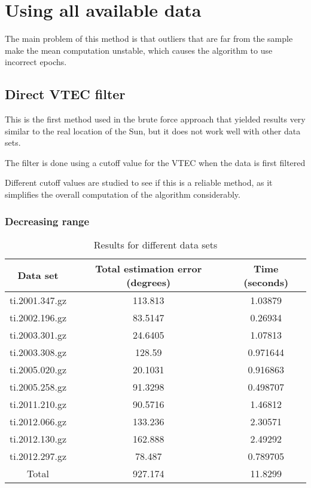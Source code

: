 \section{Using all available data}

The main problem of this method is that outliers that are far from the sample make the mean computation unstable, which causes the algorithm to use incorrect epochs.



\subsection{Direct VTEC filter}

This is the first method used in the brute force approach that yielded results very similar to the real location of the Sun, but it does not work well with other data sets.

The filter is done using a cutoff value for the VTEC when the data is first filtered

Different cutoff values are studied to see if this is a reliable method, as it simplifies the overall computation of the algorithm considerably.

\subsubsection{Decreasing range}

\begin{table}[h!]
	\centering
	\def\arraystretch{1.2}
	\begin{tabular}{|c c c|} 
		\hline
		Data set & Total estimation error (degrees) & Time (seconds) \\ [0.5ex] 
		\hline\hline
		ti.2001.347.gz & 113.813 & 1.03879 \\
		\hline
		ti.2002.196.gz & 83.5147 & 0.26934 \\
		\hline
		ti.2003.301.gz & 24.6405 & 1.07813 \\
		\hline
		ti.2003.308.gz & 128.59 & 0.971644 \\
		\hline
		ti.2005.020.gz & 20.1031 & 0.916863 \\
		\hline
		ti.2005.258.gz & 91.3298 & 0.498707 \\
		\hline
		ti.2011.210.gz & 90.5716 & 1.46812 \\
		\hline
		ti.2012.066.gz & 133.236 & 2.30571 \\
		\hline
		ti.2012.130.gz & 162.888 & 2.49292 \\
		\hline
		ti.2012.297.gz & 78.487 & 0.789705 \\
		\hline\hline
		Total & 927.174 & 11.8299 \\
		\hline
	\end{tabular}
	\caption{Results for different data sets}
\end{table}


